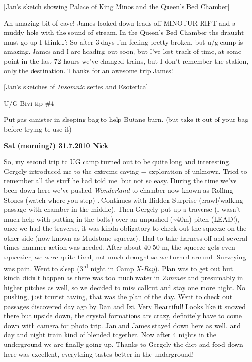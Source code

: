{[}Jan's sketch showing Palace of King Minos and the Queen's Bed
Chamber{]}

An amazing bit of cave! James looked down leads off MINOTUR RIFT and a
muddy hole with the sound of stream. In the Queen's Bed Chamber the
draught must go up I think\ldots{}? So after 3 days I'm feeling pretty
broken, but u/g camp is amazing. James and I are heading out soon, but
I've lost track of time, at some point in the last 72 hours we've
changed trains, but I don't remember the station, only the destination.
Thanks for an awesome trip James!

{[}Jan's sketches of \emph{Insomnia} series and Esoterica{]}

U/G Bivi tip \#4

Put gas canister in sleeping bag to help Butane burn. (but take it out
of your bag before trying to use it)

\textbf{Sat (morning?) 31.7.2010 Nick}

So, my second trip to UG camp turned out to be quite long and
interesting. Gergely introduced me to the extreme caving = exploration
of unknown. Tried to remember all the stuff he had told me, but not so
easy. During the time we've been down here we've pushed
\emph{Wonderland} to chamber now known as Rolling Stones (watch where
you step) . Continues with Hidden Surprise (crawl/walking passage with
chamber in the middle). Then Gergely put up a traverse (I wasn't much
help with putting in the bolts) over an unpushed (\textasciitilde{}40m)
pitch (LEAD!), once we had the traverse, it was kinda obligatory to
check out the squeeze on the other side (now known as Mudstone squeeze).
Had to take harness off and several times hammer action was needed.
After about 40-50 m, the squeeze gets even squeezier, we were quite
tired, not much draught so we turned around. Surveying was pain. Went to
sleep (3\textsuperscript{rd} night in Camp \emph{X-Ray}). Plan was to
get out but kinda didn't happen as there was too much water in
\emph{Zimmer} and presumably in higher pitches as well, so we decided to
miss callout and stay one more night. No pushing, just tourist caving,
that was the plan of the day. Went to check out passages discovered day
ago by Dan and Izi. Very Beautiful! Looks like it snowed there but
upside down, the crystal formations are crazy, definitely have to come
down with camera for photo trip. Jan and James stayed down here as well,
and day and night train kind of blended together. Now after 4 nights in
the underground we are finally going up. Thanks to Gergely the diet and
food down here was excellent, everything tastes better in the
underground!

